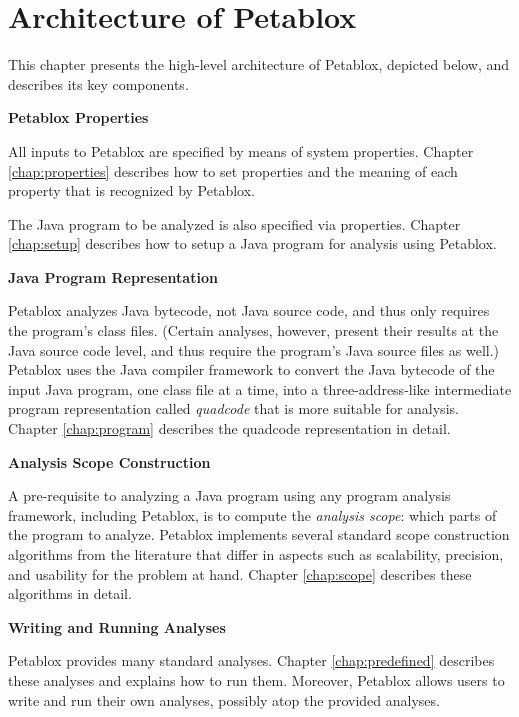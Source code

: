 \chapter{Architecture of Petablox}
\label{chap:arch}

This chapter presents the high-level architecture of Petablox, depicted below, and describes its key components.

\begin{center}
\end{center}

{\bf Petablox Properties}

All inputs to Petablox are specified by means of system properties.  Chapter
\ref{chap:properties} describes how to set properties and the meaning of each
property that is recognized by Petablox.

The Java program to be analyzed is also specified via properties.  Chapter
\ref{chap:setup} describes how to setup a Java program for analysis using Petablox.

{\bf Java Program Representation}

Petablox analyzes Java bytecode, not Java source code, and thus only requires the
program's class files.  (Certain analyses, however, present their results at the
Java source code level, and thus require the program's Java source files as
well.) Petablox uses the  Java compiler
framework to convert the Java bytecode of the input Java program, one class file
at a time, into a three-address-like intermediate program representation called
{\it quadcode} that is more suitable for analysis. Chapter \ref{chap:program}
describes the quadcode representation in detail.

{\bf Analysis Scope Construction}

A pre-requisite to analyzing a Java program using any program analysis
framework, including Petablox, is to compute the {\it analysis scope}: which parts
of the program to analyze.  Petablox implements several standard scope construction
algorithms from the literature that differ in aspects such as scalability,
precision, and usability for the problem at hand.  Chapter \ref{chap:scope}
describes these algorithms in detail.

{\bf Writing and Running Analyses}

Petablox provides many standard analyses.  Chapter \ref{chap:predefined} describes
these analyses and explains how to run them.  Moreover, Petablox allows users to
write and run their own analyses, possibly atop the provided analyses.

